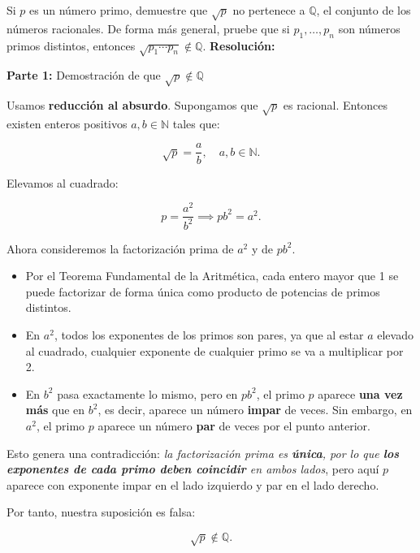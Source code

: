 \documentclass[a4paper,12pt]{article}
\begin{document}
\begin{ejercicio}[title=Ejercicio 20]
Si $p$ es un número primo, demuestre que $\sqrt{p}$ no pertenece a $\mathbb{Q}$, el conjunto de los números racionales. De forma más general, pruebe que si $p_1,\dots,p_n$ son números primos distintos, entonces $\sqrt{p_1\cdots p_n} \notin \mathbb{Q}$.
\tcblower
\textbf{Resolución:}

\textbf{Parte 1:} Demostración de que $\sqrt{p} \notin \mathbb{Q}$

Usamos \textbf{reducción al absurdo}. Supongamos que $\sqrt{p}$ es racional. Entonces existen enteros positivos $a,b \in \mathbb{N}$ tales que:

\[
\sqrt{p} = \frac{a}{b}, \quad a,b \in \mathbb{N}.
\]

Elevamos al cuadrado:

\[
p = \frac{a^2}{b^2} \implies pb^2 = a^2.
\]

Ahora consideremos la factorización prima de $a^2$ y de $pb^2$.  

\begin{itemize}
    \item Por el Teorema Fundamental de la Aritmética, cada entero mayor que 1 se puede factorizar de forma única como producto de  potencias de primos distintos.
    \item En $a^2$, todos los exponentes de los primos son pares, ya que al estar $a$ elevado al cuadrado, cualquier exponente de cualquier primo se va a multiplicar por 2. 
    \item En $b^2$ pasa exactamente lo mismo, pero en $pb^2$, el primo $p$ aparece \textbf{una vez más} que en $b^2$, es decir, aparece un número \textbf{impar} de veces. Sin embargo, en $a^2$, el primo $p$ aparece un número \textbf{par} de veces por el punto anterior.
\end{itemize}

Esto genera una contradicción: \emph{la factorización prima es \textbf{única}, por lo que \textbf{los exponentes de cada primo deben coincidir} en ambos lados}, pero aquí $p$ aparece con exponente impar en el lado izquierdo y par en el lado derecho.  

Por tanto, nuestra suposición es falsa:

\[
\boxed{\sqrt{p} \notin \mathbb{Q}}.
\]

\end{ejercicio}
\end{document}
